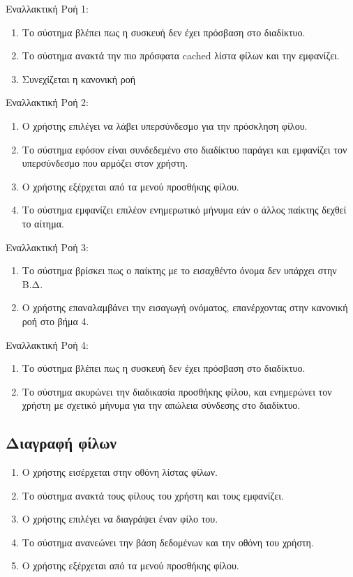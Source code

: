 Εναλλακτική Ροή 1:
\begin{enumerate}[label=2.1.\alph*.,ref=2.1.\alph*]
\item Το σύστημα βλέπει πως η συσκευή δεν έχει πρόσβαση στο διαδίκτυο.
\item Το σύστημα ανακτά την πιο πρόσφατα cached λίστα φίλων και την εμφανίζει.
\item Συνεχίζεται η κανονική ροή
\end{enumerate}

Εναλλακτική Ροή 2:
\begin{enumerate}[label=3.1.\alph*.,ref=3.1.\alph*]
\item Ο χρήστης επιλέγει να λάβει υπερσύνδεσμο για την πρόσκληση φίλου.
\item Το σύστημα εφόσον είναι συνδεδεμένο στο διαδίκτυο παράγει και εμφανίζει τον υπερσύνδεσμο που αρμόζει στον χρήστη.
\item Ο χρήστης εξέρχεται από τα μενού προσθήκης φίλου.
\item Το σύστημα εμφανίζει επιλέον ενημερωτικό μήνυμα εάν ο άλλος παίκτης δεχθεί το αίτημα.
\end{enumerate}

Εναλλακτική Ροή 3:
\begin{enumerate}[label=4.1.\alph*.,ref=4.1.\alph*]
\item Το σύστημα βρίσκει πως ο παίκτης με το εισαχθέντο όνομα δεν υπάρχει στην Β.Δ.
\item Ο χρήστης επαναλαμβάνει την εισαγωγή ονόματος, επανέρχοντας στην κανονική ροή στο βήμα 4.
\end{enumerate}

Εναλλακτική Ροή 4:
\begin{enumerate}[label=4.2.\alph*.,ref=4.2.\alph*]
\item Το σύστημα βλέπει πως η συσκευή δεν έχει πρόσβαση στο διαδίκτυο.
\item Το σύστημα ακυρώνει την διαδικασία προσθήκης φίλου, και ενημερώνει τον χρήστη με σχετικό μήνυμα για την απώλεια σύνδεσης στο διαδίκτυο. 
\end{enumerate}

\newpage
\subsection{Διαγραφή φίλων}
\label{sec:deletefriend}
\begin{enumerate}
\item Ο χρήστης εισέρχεται στην οθόνη λίστας φίλων.
\item Το σύστημα ανακτά τους φίλους του χρήστη και τους εμφανίζει.
\item Ο χρήστης επιλέγει να διαγράψει έναν φίλο του.
\item Το σύστημα ανανεώνει την βάση δεδομένων και την οθόνη του χρήστη.
\item Ο χρήστης εξέρχεται από τα μενού προσθήκης φίλου.
\end{enumerate}

